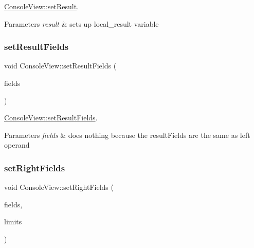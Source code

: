 \hyperlink{class_console_view_a0b43a9e8d693b227fcd3a00b7a384e37}{Console\+View\+::set\+Result}. 


\begin{DoxyParams}{Parameters}
{\em result} & sets up local\+\_\+result variable \\
\hline
\end{DoxyParams}
\mbox{\label{class_console_view_afeb190605800a7ce7b8b3224a32b15a3}} 
\subsubsection{\texorpdfstring{set\+Result\+Fields}{setResultFields}}
{\footnotesize\ttfamily void Console\+View\+::set\+Result\+Fields (\begin{DoxyParamCaption}\item[{const int \&}]{fields }\end{DoxyParamCaption})\hspace{0.3cm}{\ttfamily [slot]}}



\hyperlink{class_console_view_afeb190605800a7ce7b8b3224a32b15a3}{Console\+View\+::set\+Result\+Fields}. 


\begin{DoxyParams}{Parameters}
{\em fields} & does nothing because the result\+Fields are the same as left operand \\
\hline
\end{DoxyParams}
\mbox{\label{class_console_view_a2b9ba00770ebdeda35f2b506c752248e}} 
\subsubsection{\texorpdfstring{set\+Right\+Fields}{setRightFields}}
{\footnotesize\ttfamily void Console\+View\+::set\+Right\+Fields (\begin{DoxyParamCaption}\item[{const int \&}]{fields,  }\item[{const Q\+Vector$<$ Q\+String $>$ \&}]{limits }\end{DoxyParamCaption})\hspace{0.3cm}{\ttfamily [slot]}}



